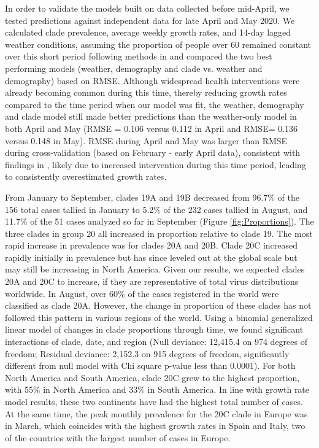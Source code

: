 \documentclass[9pt,twocolumn,twoside,lineno]{pnas-new}
\begin{document}
In order to validate the models built on data collected before mid-April, we tested predictions against independent data for late April and May 2020. We calculated clade prevalence, average weekly growth rates, and 14-day lagged weather conditions, assuming the proportion of people over 60 remained constant over this short period following methods in \cite{Merow2020-be} and compared the two best performing models (weather, demography and clade vs. weather and demography) based on RMSE. Although widespread health interventions were already becoming common during this time, thereby reducing growth rates compared to the time period when our model was fit, the weather, demography and clade model still made better predictions than the weather-only model in both April and May (RMSE =  0.106 versus 0.112 in April and RMSE= 0.136 versus  0.148 in May). RMSE during April and May was larger than RMSE during cross-validation (based on February - early April data), consistent with findings in \cite{Merow2020-be}, likely due to increased intervention during this time period, leading to consistently overestimated growth rates.

From January to September, clades 19A and 19B decreased from 96.7\% of the 156 total cases tallied in January to 5.2\% of the 232 cases tallied in August, and 11.7\% of the 51 cases analyzed so far in September (Figure \ref{fig:Proportions}). The three clades in group 20 all increased in proportion relative to clade 19. The most rapid increase in prevalence was for clades 20A and 20B. Clade 20C increased rapidly initially in prevalence but has since leveled out at the global scale but may still be increasing in North America. Given our results, we expected clades 20A and 20C to increase, if they are representative of total virus distributions worldwide. In August, over 60\% of the cases registered in the world were classified as clade 20A. However, the change in proportion of these clades has not followed this pattern in various regions of the world. Using a binomial generalized linear model of changes in clade proportions through time, we found significant interactions of clade, date, and region (Null deviance: 12,415.4  on 974  degrees of freedom; Residual deviance: 2,152.3  on 915  degrees of freedom, significantly different from null model with Chi square p-value less than 0.0001). For both North America and South America, clade 20C grew to the highest proportion, with 55\% in North America and 33\% in South America. In line with growth rate model results, these two continents have had the highest total number of cases. At the same time, the peak monthly prevalence for the 20C clade in Europe was in March, which coincides with the highest growth rates in Spain and Italy, two of the countries with the largest number of cases in Europe. 
\end{document}
